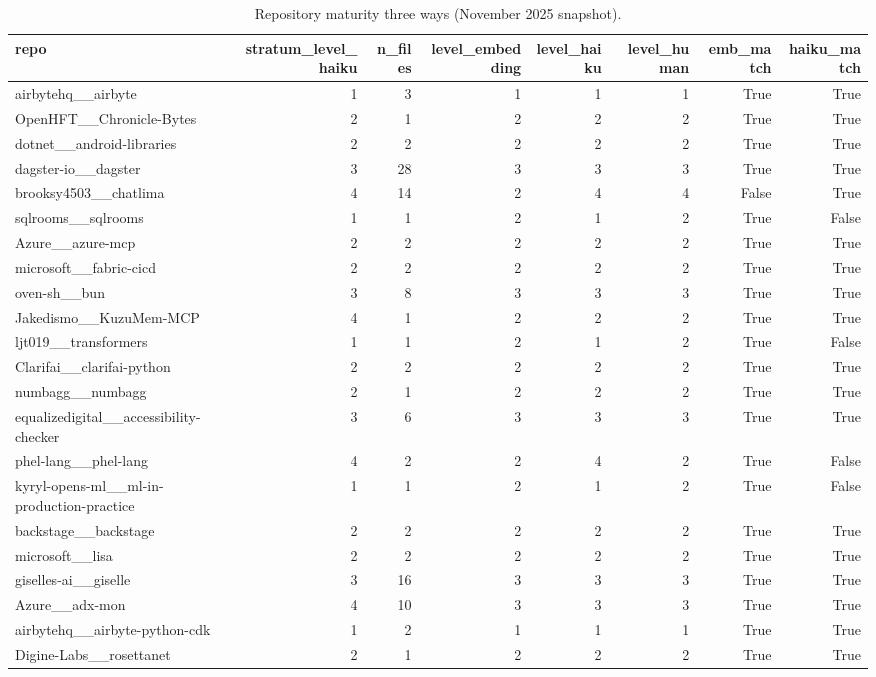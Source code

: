 \begin{table}[t]
\centering
\caption{Repository maturity three ways (November 2025 snapshot).}
\label{tab:repo-full}
\begin{tabular}{lrrrrrrr}
\toprule
repo & stratum\_level\_haiku & n\_files & level\_embedding & level\_haiku & level\_human & emb\_match & haiku\_match \\
\midrule
airbytehq\_\_airbyte & 1 & 3 & 1 & 1 & 1 & True & True \\
OpenHFT\_\_Chronicle-Bytes & 2 & 1 & 2 & 2 & 2 & True & True \\
dotnet\_\_android-libraries & 2 & 2 & 2 & 2 & 2 & True & True \\
dagster-io\_\_dagster & 3 & 28 & 3 & 3 & 3 & True & True \\
brooksy4503\_\_chatlima & 4 & 14 & 2 & 4 & 4 & False & True \\
sqlrooms\_\_sqlrooms & 1 & 1 & 2 & 1 & 2 & True & False \\
Azure\_\_azure-mcp & 2 & 2 & 2 & 2 & 2 & True & True \\
microsoft\_\_fabric-cicd & 2 & 2 & 2 & 2 & 2 & True & True \\
oven-sh\_\_bun & 3 & 8 & 3 & 3 & 3 & True & True \\
Jakedismo\_\_KuzuMem-MCP & 4 & 1 & 2 & 2 & 2 & True & True \\
ljt019\_\_transformers & 1 & 1 & 2 & 1 & 2 & True & False \\
Clarifai\_\_clarifai-python & 2 & 2 & 2 & 2 & 2 & True & True \\
numbagg\_\_numbagg & 2 & 1 & 2 & 2 & 2 & True & True \\
equalizedigital\_\_accessibility-checker & 3 & 6 & 3 & 3 & 3 & True & True \\
phel-lang\_\_phel-lang & 4 & 2 & 2 & 4 & 2 & True & False \\
kyryl-opens-ml\_\_ml-in-production-practice & 1 & 1 & 2 & 1 & 2 & True & False \\
backstage\_\_backstage & 2 & 2 & 2 & 2 & 2 & True & True \\
microsoft\_\_lisa & 2 & 2 & 2 & 2 & 2 & True & True \\
giselles-ai\_\_giselle & 3 & 16 & 3 & 3 & 3 & True & True \\
Azure\_\_adx-mon & 4 & 10 & 3 & 3 & 3 & True & True \\
airbytehq\_\_airbyte-python-cdk & 1 & 2 & 1 & 1 & 1 & True & True \\
Digine-Labs\_\_rosettanet & 2 & 1 & 2 & 2 & 2 & True & True \\

\end{tabular}
\end{table}
